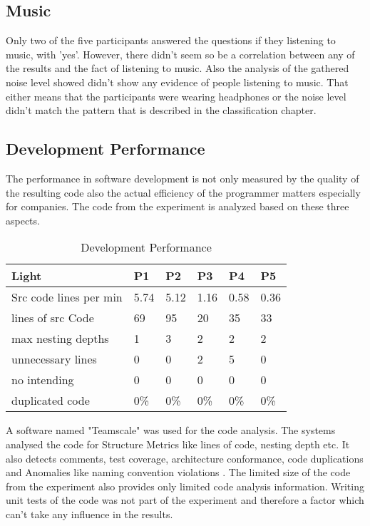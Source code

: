 \subsection{Music}
Only two of the five participants answered the questions if they listening to music, with 'yes'. However, there didn't seem so be a correlation between any of the results and the fact of listening to music. Also the analysis of the gathered noise level showed didn't show any evidence of people listening to music. That either means that the participants were wearing headphones or the noise level didn't match the pattern that is described in the classification chapter. 

\subsection{Development Performance}
The performance in software development is not only measured by the quality of the resulting code also the actual efficiency of the programmer matters especially for companies.
The code from the experiment is analyzed based on these three aspects.  

\begin{table}[ht]
  \begin{tabular}{|P{2.5cm}|P{1.8cm}|P{1.8cm}|P{1.8cm}|P{1.8cm}|P{1.8cm}|}
   	\textbf{Light}				& \textbf{P1}			& \textbf{P2}			& 	\textbf{P3}		& 	\textbf{P4}			& 	\textbf{P5}			\\ \hline
  	Src code lines per min	& 5.74						& 5.12						& 	1.16					& 0.58						& 0.36						\\ \hline
  	lines of src Code 			& 69							& 95							& 	20					& 35							& 33							\\ \hline
  	max nesting depths		& 1							& 3							& 	2						& 2							& 2							\\ \hline
  	unnecessary lines			& 0							& 0							& 	2						& 5							& 0							\\ \hline
  	no intending					& 0							& 0							& 	0						& 0							& 0							\\ \hline
  	duplicated code			& 0\%						& 0\%						&	 0\%					& 0\%						& 0\%						\\ \hline
  	\end{tabular}
  	\newline\newline
  	\caption{Development Performance}\label{codePerformance}
\end{table}

A software named "Teamscale" was used for the code analysis. The systems analysed the code for Structure Metrics like lines of code, nesting depth etc. It also detects comments, test coverage, architecture conformance, code duplications and Anomalies like naming convention violations \cite{heinemann2014teamscale}.
\bigbreak
The limited size of the code from the experiment also provides only limited code analysis information. 
Writing unit tests of the code was not part of the experiment and therefore a factor which can't take any influence in the results. 

